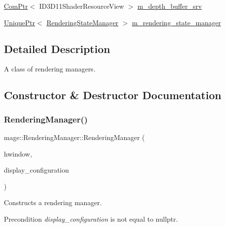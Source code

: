 \begin{DoxyCompactItemize}
\item 
\hyperlink{namespacemage_ae74f374780900893caa5555d1031fd79}{Com\+Ptr}$<$ I\+D3\+D11\+Shader\+Resource\+View $>$ \hyperlink{classmage_1_1_rendering_manager_a224a29e5f6befd5079f8303351cf30ae}{m\+\_\+depth\+\_\+buffer\+\_\+srv}
\item 
\hyperlink{namespacemage_a3316d7143a973e37adf1110f2e80ca31}{Unique\+Ptr}$<$ \hyperlink{structmage_1_1_rendering_state_manager}{Rendering\+State\+Manager} $>$ \hyperlink{classmage_1_1_rendering_manager_aa31eab8068bf43e3b90f72644495c16a}{m\+\_\+rendering\+\_\+state\+\_\+manager}
\end{DoxyCompactItemize}


\subsection{Detailed Description}
A class of rendering managers. 

\subsection{Constructor \& Destructor Documentation}
\hypertarget{classmage_1_1_rendering_manager_aaff7375b93bf6019ff7aafb845b1a7a0}{}\label{classmage_1_1_rendering_manager_aaff7375b93bf6019ff7aafb845b1a7a0} 
\subsubsection{\texorpdfstring{Rendering\+Manager()}{RenderingManager()}\hspace{0.1cm}{\footnotesize\ttfamily [1/3]}}
{\footnotesize\ttfamily mage\+::\+Rendering\+Manager\+::\+Rendering\+Manager (\begin{DoxyParamCaption}\item[{H\+W\+ND}]{hwindow,  }\item[{const \hyperlink{structmage_1_1_display_configuration}{Display\+Configuration} $\ast$}]{display\+\_\+configuration }\end{DoxyParamCaption})\hspace{0.3cm}{\ttfamily [explicit]}}

Constructs a rendering manager.

\begin{DoxyPrecond}{Precondition}
{\itshape display\+\_\+configuration} is not equal to {\ttfamily nullptr}. 
\end{DoxyPrecond}


